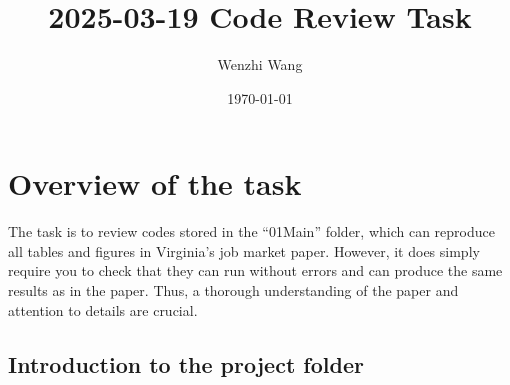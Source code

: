 \documentclass[12pt]{article}
\newcommand{\highlightP}[1]{{\emph{\color{MyPink}{#1}}}}
\theoremstyle{definition}
\begin{document}
 


\title{\bf 2025-03-19 Code Review Task} 
\author{Wenzhi Wang} 
\date{\today} 
\maketitle 

\section{Overview of the task}

The task is to review codes stored in the ``01Main'' folder, which can reproduce all tables and figures in Virginia's job market paper. However, it does \highlightP{not} simply require you to check that they can run without errors and can produce the same results as in the paper. \highlightP{Instead, it requires you to check the codes can produce something that makes sense, that fits the description in the paper.} Thus, a thorough understanding of the paper and attention to details are crucial.

\subsection{Introduction to the project folder}
\end{document}
